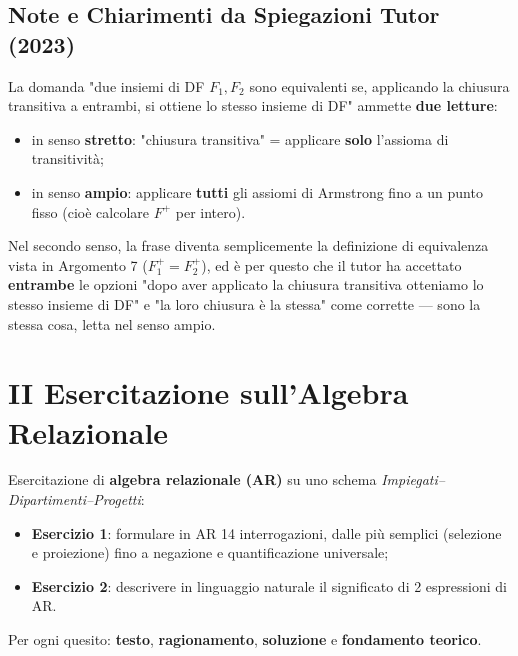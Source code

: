 \documentclass[12pt, a4paper]{article}
\begin{document}
\subsection{Note e Chiarimenti da Spiegazioni Tutor (2023)}

\begin{tcolorbox}[colback=lightergray!10, colframe=tocsec, title=\textbf{Nota: cosa significa "chiusura transitiva" di un insieme di DF}]
La domanda "due insiemi di DF $F_1,F_2$ sono equivalenti se, applicando la chiusura transitiva a entrambi, si ottiene lo stesso insieme di DF" ammette \textbf{due letture}:
\begin{itemize}
    \item in senso \textbf{stretto}: "chiusura transitiva" = applicare \textbf{solo} l'assioma di transitività;
    \item in senso \textbf{ampio}: applicare \textbf{tutti} gli assiomi di Armstrong fino a un punto fisso (cioè calcolare $F^+$ per intero).
\end{itemize}
Nel secondo senso, la frase diventa semplicemente la definizione di equivalenza vista in Argomento 7 ($F_1^+=F_2^+$), ed è per questo che il tutor ha accettato \textbf{entrambe} le opzioni "dopo aver applicato la chiusura transitiva otteniamo lo stesso insieme di DF" e "la loro chiusura è la stessa" come corrette — sono la stessa cosa, letta nel senso ampio.
\end{tcolorbox}



\section{II Esercitazione sull'Algebra Relazionale}

Esercitazione di \textbf{algebra relazionale (AR)} su uno schema \textit{Impiegati--Dipartimenti--Progetti}:
\begin{itemize}
\item \textbf{Esercizio 1}: formulare in AR 14 interrogazioni, dalle più semplici (selezione e proiezione) fino a negazione e quantificazione universale;
\item \textbf{Esercizio 2}: descrivere in linguaggio naturale il significato di 2 espressioni di AR.
\end{itemize}
Per ogni quesito: \textbf{testo}, \textbf{ragionamento}, \textbf{soluzione} e \textbf{fondamento teorico}.
\end{document}
